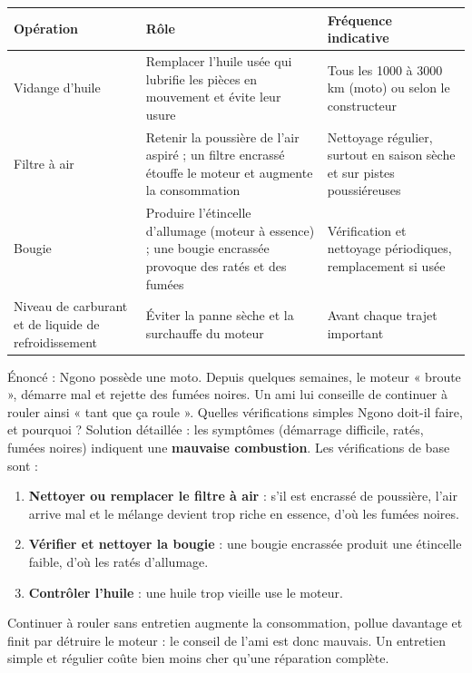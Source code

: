 \documentclass[11pt]{article}
\begin{document}
\begin{center}
\begin{tabularx}{\linewidth}{|l|X|X|}\hline
\rowcolor{popblueL} \textbf{Opération} & \textbf{Rôle} & \textbf{Fréquence indicative} \\ \hline
Vidange d'huile & Remplacer l'huile usée qui lubrifie les pièces en mouvement et évite leur usure & Tous les \num{1000} à \num{3000} km (moto) ou selon le constructeur \\ \hline
Filtre à air & Retenir la poussière de l'air aspiré ; un filtre encrassé étouffe le moteur et augmente la consommation & Nettoyage régulier, surtout en saison sèche et sur pistes poussiéreuses \\ \hline
Bougie & Produire l'étincelle d'allumage (moteur à essence) ; une bougie encrassée provoque des ratés et des fumées & Vérification et nettoyage périodiques, remplacement si usée \\ \hline
Niveau de carburant et de liquide de refroidissement & Éviter la panne sèche et la surchauffe du moteur & Avant chaque trajet important \\ \hline
\end{tabularx}
\end{center}

\begin{exoresolu}
Énoncé : Ngono possède une moto. Depuis quelques semaines, le moteur « broute », démarre mal et rejette des fumées noires. Un ami lui conseille de continuer à rouler ainsi « tant que ça roule ». Quelles vérifications simples Ngono doit-il faire, et pourquoi ?
\tcblower
Solution détaillée : les symptômes (démarrage difficile, ratés, fumées noires) indiquent une \textbf{mauvaise combustion}. Les vérifications de base sont :
\begin{enumerate}
\item \textbf{Nettoyer ou remplacer le filtre à air} : s'il est encrassé de poussière, l'air arrive mal et le mélange devient trop riche en essence, d'où les fumées noires.
\item \textbf{Vérifier et nettoyer la bougie} : une bougie encrassée produit une étincelle faible, d'où les ratés d'allumage.
\item \textbf{Contrôler l'huile} : une huile trop vieille use le moteur.
\end{enumerate}
Continuer à rouler sans entretien augmente la consommation, pollue davantage et finit par détruire le moteur : le conseil de l'ami est donc mauvais. Un entretien simple et régulier coûte bien moins cher qu'une réparation complète.
\end{exoresolu}
\end{document}
